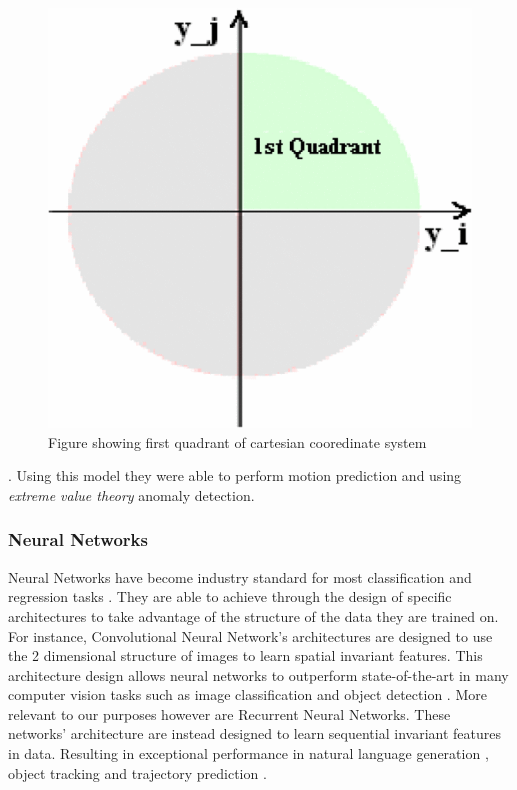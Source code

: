 \documentclass[bsc,frontabs,twoside,singlespacing,parskip,deptreport]{infthesis}     %
\begin{document}
\begin{figure}
    \centering
    \includegraphics[scale=0.4]{report/images/quadrant.png}
    \caption{Figure showing first quadrant of cartesian cooredinate system \cite{kowalska2012maritime}}
    \label{fig:quad}
\end{figure}

.  Using this model they were able to perform motion prediction and using \emph{extreme value theory} anomaly detection.


\subsubsection{Neural Networks}
Neural Networks have become industry standard for most classification and regression tasks \cite{lathuiliere2018comprehensive}. They are able to achieve through the design of specific architectures to take advantage of the structure of the data they are trained on. For instance, Convolutional Neural Network's architectures are designed to use the 2 dimensional structure of images to learn spatial invariant features. This architecture design allows neural networks to outperform state-of-the-art in many computer vision tasks such as image classification \cite{krizhevsky2012imagenet, he2016deep} and object detection \cite{ren2015faster, he2016deep}. More relevant to our purposes however are Recurrent Neural Networks. These networks' architecture are instead designed to learn sequential invariant features in data. Resulting in exceptional performance in natural language generation \cite{wen2015semantically}, object tracking \cite{srivastava2015unsupervised} and trajectory prediction \cite{kim2017probabilistic}.
\end{document}
